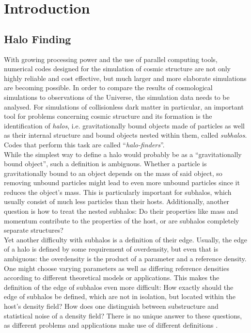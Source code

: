 \section{Introduction}

\subsection{Halo Finding}

With growing processing power and the use of parallel computing tools, numerical codes designed for the simulation of cosmic structure are not only highly reliable and cost effective, but much larger and more elaborate simulations are becoming possible. 
In order to compare the results of cosmological simulations to observations of the Universe, the simulation  data needs to be analysed. 
For simulations of collisionless dark matter in particular, an important  tool for problems concerning cosmic structure and its formation is the identification of \emph{halos}, i.e. gravitationally bound objects made of particles as well as their internal structure and bound objects nested within them, called \emph{subhalos}. 
Codes that perform this task are called ``\emph{halo-finders}''.\\ 
While the simplest way to define a halo would probably be as a ``gravitationally bound object'', such a definition is ambiguous. 
Whether a particle is gravitationally bound to an object depends on the mass of said object, so removing unbound particles might lead to even more unbound particles since it reduces the object's mass.
This is particularly important for subhalos, which usually consist of much less particles than their hosts.
Additionally, another question is how to treat the nested subhalos:
Do their properties like mass and momentum contribute to the properties of the host, or are subhalos completely separate structures?\\
Yet another difficulty with subhalos is a definition of their edge.
Usually, the edge of a halo is defined by some requirement of overdensity, but even that is ambiguous: 
the overdensity is the product of a parameter and a reference density. 
One might choose varying parameters as well as differing reference densities according to different theoretical models or applications.
This makes the definition of the edge of subhalos even more difficult: How exactly should the edge of subhalos be defined, which are not in isolation, but located within the host's density field?
How does one distinguish between substructure and statistical noise of a density field?
There is no unique answer to these questions, as different problems and applications make use of different definitions \parencite{soa}. 




